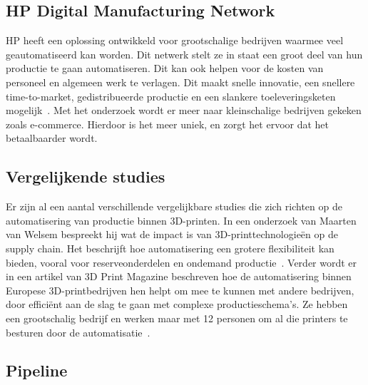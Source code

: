 \subsection{HP Digital Manufacturing Network}%

HP heeft een oplossing ontwikkeld voor grootschalige bedrijven waarmee veel geautomatiseerd kan worden. Dit netwerk stelt ze in staat een groot deel van hun productie te gaan automatiseren. Dit kan ook helpen voor de kosten van personeel en algemeen werk te verlagen. Dit maakt snelle innovatie, een snellere time-to-market, gedistribueerde productie en een slankere toeleveringsketen mogelijk~\autocite{hp3DprintingNetwork}. Met het onderzoek wordt er meer naar kleinschalige bedrijven gekeken zoals e-commerce. Hierdoor is het meer uniek, en zorgt het ervoor dat het betaalbaarder wordt.



\subsection{Vergelijkende studies}%

Er zijn al een aantal verschillende vergelijkbare studies die zich richten op de automatisering van productie binnen 3D-printen. In een onderzoek van Maarten van Welsem bespreekt hij wat de impact is van 3D-printtechnologieën op de supply chain. Het beschrijft hoe automatisering een grotere flexibiliteit kan bieden, vooral voor reserveonderdelen en ondemand productie~\autocite{emerce3DprintSupplyChain}. Verder wordt er in een artikel van 3D Print Magazine beschreven hoe de automatisering binnen Europese 3D-printbedrijven hen helpt om mee te kunnen met andere bedrijven, door efficiënt aan de slag te gaan met complexe productieschema's. Ze hebben een grootschalig bedrijf en werken maar met 12 personen om al die printers te besturen door de automatisatie~\autocite{3dprintmagAutomation}. 


\subsection{Pipeline}%

